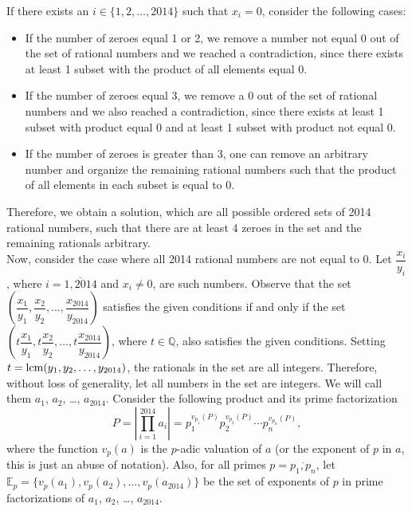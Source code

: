 \documentclass[11pt]{article}
\begin{document}
        \begin{solution}
            If there exists an \(i \in \{1,2,\dots,2014\}\) such that \(x_i = 0\), consider the following cases:
            \begin{itemize}
                \item If the number of zeroes equal 1 or 2, we remove a number not equal 0 out of the set of rational numbers and we reached a contradiction, since there exists at least 1 subset with the product of all elements equal 0.
                \item If the number of zeroes equal 3, we remove a 0 out of the set of rational numbers and we also reached a contradiction, since there exists at least 1 subset with product equal 0 and at least 1 subset with product not equal 0.
                \item If the number of zeroes is greater than 3, one can remove an arbitrary number and organize the remaining rational numbers such that the product of all elements in each subset is equal to 0.
            \end{itemize}
            Therefore, we obtain a solution, which are all possible ordered sets of 2014 rational numbers, such that there are at least 4 zeroes in the set and the remaining rationals arbitrary.\\
            Now, consider the case where all 2014 rational numbers are not equal to 0. Let \(\dfrac{x_i}{y_i}\), where \(i = \overline{1,2014}\) and \(x_i \neq 0\), are such numbers. Observe that the set \(\left(\dfrac{x_1}{y_1}, \dfrac{x_2}{y_2}, \dots, \dfrac{x_{2014}}{y_{2014}}\right)\) satisfies the given conditions if and only if the set \(\left(t\dfrac{x_1}{y_1}, t\dfrac{x_2}{y_2}, \dots, t\dfrac{x_{2014}}{y_{2014}}\right)\), where \(t \in \mathbb{Q}\), also satisfies the given conditions. Setting \(t = \operatorname{lcm} (y_1, y_2, \dots, y_{2014})\), the rationals in the set are all integers. Therefore, without loss of generality, let all numbers in the set are integers. We will call them \(a_1\), \(a_2\), \dots, \(a_{2014}\). Consider the following product and its prime factorization
            \[P = \left| \prod_{i=1}^{2014} a_i \right| = p_1^{v_{p_1}(P)} p_2^{v_{p_2}(P)} \cdots p_n^{v_{p_n}(P)},\]
            where the function \(v_p(a)\) is the \(p\)-adic valuation of \(a\) (or the exponent of \(p\) in \(a\), this is just an abuse of notation). Also, for all primes \(p = \overline{p_1,p_n}\), let \(\mathbb{E}_p = \{v_p(a_1), v_p(a_2), \dots, v_p(a_{2014})\}\) be the set of exponents of \(p\) in prime factorizations of \(a_1\), \(a_2\), \dots, \(a_{2014}\).\\

\end{solution}
\end{document}
